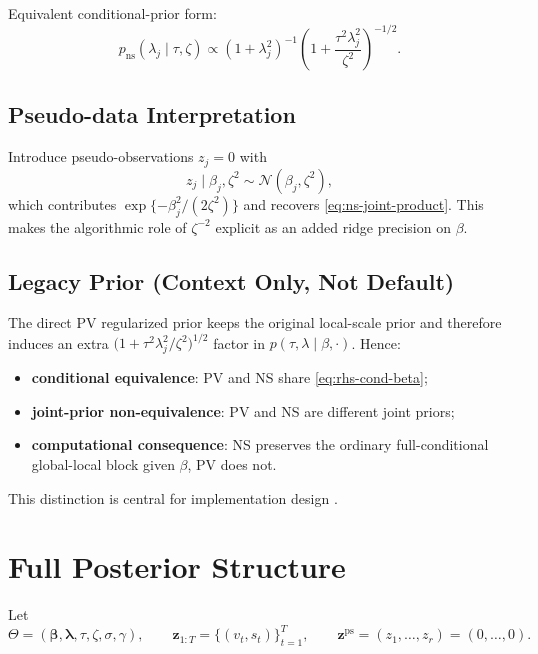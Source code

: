 \documentclass[11pt]{article}
\newcommand{\N}{\mathcal{N}}
\newcommand{\vect}[1]{\bm{#1}}
\begin{document}
Equivalent conditional-prior form:
\begin{equation}
  p_{\mathrm{ns}}(\lambda_j\mid\tau,\zeta)
  \propto
  (1+\lambda_j^2)^{-1}
  \left(1+\frac{\tau^2\lambda_j^2}{\zeta^2}\right)^{-1/2}.
  \label{eq:ns-induced-local-prior}
\end{equation}

\subsection{Pseudo-data Interpretation}

Introduce pseudo-observations $z_j=0$ with
\begin{equation}
  z_j\mid\beta_j,\zeta^2 \sim \N(\beta_j,\zeta^2),
\end{equation}
which contributes $\exp\{-\beta_j^2/(2\zeta^2)\}$ and recovers
\eqref{eq:ns-joint-product}. This makes the algorithmic role of $\zeta^{-2}$ explicit as an added ridge precision on $\beta$.

\subsection{Legacy Prior (Context Only, Not Default)}

The direct PV regularized prior keeps the original local-scale prior and therefore induces an extra
$\big(1+\tau^2\lambda_j^2/\zeta^2\big)^{1/2}$ factor in
$p(\tau,\lambda\mid\beta,\cdot)$.
Hence:
\begin{itemize}[leftmargin=1.7em]
  \item \textbf{conditional equivalence}: PV and NS share \eqref{eq:rhs-cond-beta};
  \item \textbf{joint-prior non-equivalence}: PV and NS are different joint priors;
  \item \textbf{computational consequence}: NS preserves the ordinary full-conditional global-local block given $\beta$, PV does not.
\end{itemize}
This distinction is central for implementation design \cite{piironen-vehtari,nishimura-suchard,bhattacharya-khare-pal}.

\section{Full Posterior Structure}
\label{sec:posterior}

Let
\begin{equation}
  \Theta = (\vect{\beta},\vect{\lambda},\tau,\zeta,\sigma,\gamma),
  \qquad
  \vect{z}_{1:T} = \{(v_t,s_t)\}_{t=1}^T,
  \qquad
  \vect{z}^{\mathrm{ps}} = (z_1,\dots,z_r)=(0,\dots,0).
\end{equation}
\end{document}
